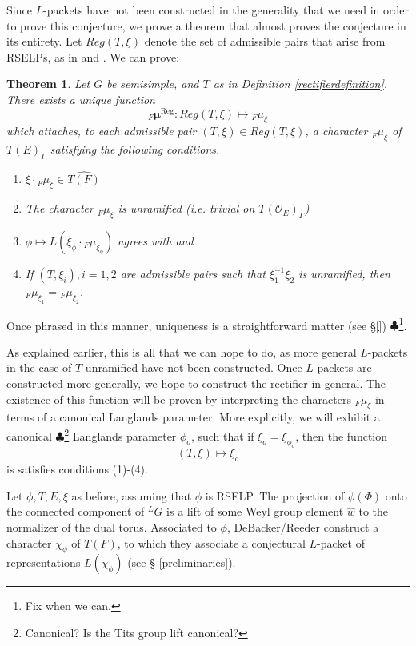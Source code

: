 \documentclass[11pt]{amsart}
\theoremstyle{plain}
\newtheorem{theorem}{Theorem}[section]
\newcommand{\MAxxx}[1]{$\clubsuit$\footnote{#1}}
\theoremstyle{definition}
\begin{document}
Since $L$-packets have not been constructed in the generality that 
we need in order to prove this conjecture, we prove a theorem that 
almost proves the conjecture in its entirety.  Let $Reg(T, \xi)$ denote 
the set of admissible pairs that arise from RSELPs,
as in \cite{debackerreeder} and \cite{reeder}.  We can prove:

\begin{theorem}\label{regularrectifierdefinition}
Let $G$ be semisimple, and $T$ as in Definition \ref{rectifierdefinition}.
There exists a unique function $${}_F
  \boldsymbol\mu^{\mathrm{Reg}} : Reg(T, \xi) \mapsto {}_F \mu_{\xi}$$ which attaches,
  to each admissible pair $(T, \xi) \in Reg(T,\xi)$, a character ${}_F
  \mu_{\xi}$ of $T(E)_{\Gamma}$ satisfying the following conditions.

\begin{enumerate}
\item $\xi \cdot {}_F \mu_{\xi} \in \widehat{T(F)}$

\item The character ${}_F \mu_{\xi}$ is unramified (i.e. trivial on
  $T(\mathcal{O}_E)_{\Gamma}$)

\item $\phi \mapsto L(\xi_{\phi} \cdot {}_F \mu_{\xi_{\phi}})$
  agrees with \cite{debackerreeder} and \cite{reeder}

\item If $(T, \xi_i), i = 1,2$ are admissible pairs  such that
$\xi_1^{-1} \xi_2$ is unramified, then
${}_F \mu_{\xi_1} = {}_F \mu_{\xi_2}$.
\end{enumerate}
\end{theorem}

Once phrased in this manner, uniqueness is a straightforward matter
(see \S\ref{}) \MAxxx{Fix when we can.}.

As explained earlier, this is all that we can hope to do,
as more general $L$-packets in the case of $T$ unramified have not been
constructed.  Once $L$-packets are constructed more generally, we hope to
construct the rectifier in general.  The existence of this function
will be proven by interpreting the characters ${}_F \mu_{\xi}$
in terms of a canonical Langlands parameter.  More explicitly,
we will exhibit a canonical
\MAxxx{Canonical?  Is the Tits group lift canonical?} Langlands
parameter $\phi_{o}$, such that if $\xi_o = \xi_{\phi_o}$, then the
function $$(T, \xi) \mapsto \xi_o$$ is satisfies conditions (1)-(4).

Let $\phi, T, E, \xi$ as before, assuming that $\phi$ is RSELP.
The projection of $\phi(\Phi)$ onto the connected component of ${}^L
G$ is a lift of some Weyl group element $\hat{w}$ to the normalizer of
the dual torus.  Associated to $\phi$, DeBacker/Reeder construct a
character $\chi_{\phi}$ of $T(F)$, to which they associate a
conjectural $L$-packet of representations $L(\chi_{\phi})$ (see \S
\ref{preliminaries}).
\end{document}
